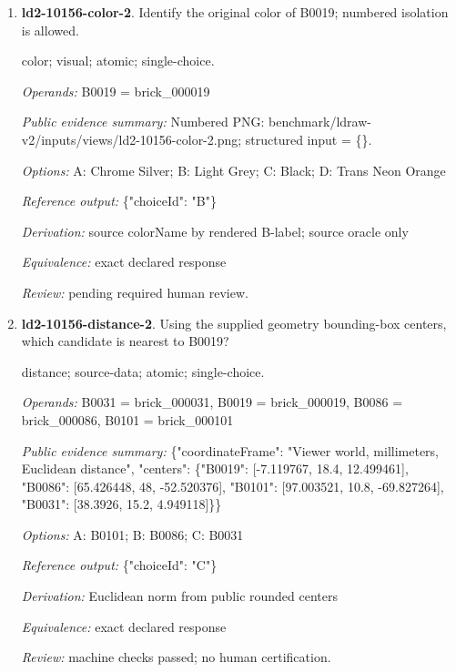 \begin{enumerate}
\par{\small distance; source-data; atomic; single-choice.\par\textit{Operands:} B0093 = brick\_000093, B0069 = brick\_000069, B0045 = brick\_000045, B0067 = brick\_000067\par\textit{Public evidence summary:} \{"coordinateFrame": "Viewer world, millimeters, Euclidean distance", "centers": \{"B0069": [68.105528, 47.2, -7.879336], "B0045": [38.606308, 15.2, -36.974207], "B0067": [-3.769975, 28.8, 11.199482], "B0093": [60.18416, 72.8, -26.399917]\}\}\par\textit{Options:} A: B0045; B: B0067; C: B0093\par\textit{Reference output:} \{"choiceId": "C"\}\par\textit{Derivation:} Euclidean norm from public rounded centers\par\textit{Equivalence:} exact declared response\par\textit{Review:} machine checks passed; no human certification.}
\item \textbf{ld2-10156-color-2}. Identify the original color of B0019; numbered isolation is allowed.
\par{\small color; visual; atomic; single-choice.\par\textit{Operands:} B0019 = brick\_000019\par\textit{Public evidence summary:} Numbered PNG: benchmark/ldraw-v2/inputs/views/ld2-10156-color-2.png; structured input = \{\}.\par\textit{Options:} A: Chrome Silver; B: Light Grey; C: Black; D: Trans Neon Orange\par\textit{Reference output:} \{"choiceId": "B"\}\par\textit{Derivation:} source colorName by rendered B-label; source oracle only\par\textit{Equivalence:} exact declared response\par\textit{Review:} pending required human review.}
\item \textbf{ld2-10156-distance-2}. Using the supplied geometry bounding-box centers, which candidate is nearest to B0019?
\par{\small distance; source-data; atomic; single-choice.\par\textit{Operands:} B0031 = brick\_000031, B0019 = brick\_000019, B0086 = brick\_000086, B0101 = brick\_000101\par\textit{Public evidence summary:} \{"coordinateFrame": "Viewer world, millimeters, Euclidean distance", "centers": \{"B0019": [-7.119767, 18.4, 12.499461], "B0086": [65.426448, 48, -52.520376], "B0101": [97.003521, 10.8, -69.827264], "B0031": [38.3926, 15.2, 4.949118]\}\}\par\textit{Options:} A: B0101; B: B0086; C: B0031\par\textit{Reference output:} \{"choiceId": "C"\}\par\textit{Derivation:} Euclidean norm from public rounded centers\par\textit{Equivalence:} exact declared response\par\textit{Review:} machine checks passed; no human certification.}

\end{enumerate}
